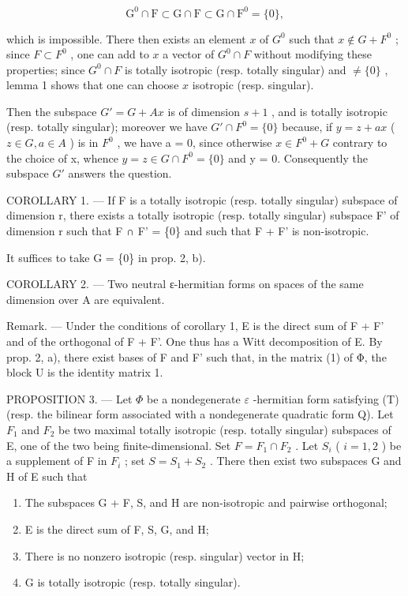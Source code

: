 \[
\mathrm{G} ^ {0} \cap \mathrm{F} \subset \mathrm{G} \cap \mathrm{F} \subset \mathrm{G} \cap \mathrm{F} ^ {0} = \{0 \},
\]

which is impossible. There then exists an element \(x\) of \(G^0\) such that \(x \notin G + F^0\) ; since \(F \subset F^0\) , one can add to \(x\) a vector of \(G^0 \cap F\) without modifying these properties; since \(G^0 \cap F\) is totally isotropic (resp. totally singular) and \(\neq \{0\}\) , lemma 1 shows that one can choose \(x\) isotropic (resp. singular).

Then the subspace \(G' = G + Ax\) is of dimension \(s + 1\) , and is totally isotropic (resp. totally singular); moreover we have \(G' \cap F^{0} = \{0\}\) because, if \(y = z + ax\) ( \(z \in G, a \in A\) ) is in \(F^{0}\) , we have a = 0, since otherwise \(x \in F^{0} + G\) contrary to the choice of x, whence \(y = z \in G \cap F^{0} = \{0\}\) and y = 0. Consequently the subspace \(G'\) answers the question.

COROLLARY 1. --- If F is a totally isotropic (resp. totally singular) subspace of dimension r, there exists a totally isotropic (resp. totally singular) subspace F' of dimension r such that F ∩ F' = \{0\} and such that F + F' is non-isotropic.

It suffices to take G = \{0\} in prop. 2, b).

COROLLARY 2. --- Two neutral ε-hermitian forms on spaces of the same dimension over A are equivalent.

Remark. --- Under the conditions of corollary 1, E is the direct sum of F + F' and of the orthogonal of F + F'. One thus has a Witt decomposition of E. By prop. 2, a), there exist bases of F and F' such that, in the matrix (1) of Φ, the block U is the identity matrix 1.

PROPOSITION 3. --- Let \(\Phi\) be a nondegenerate \(\varepsilon\) -hermitian form satisfying (T) (resp. the bilinear form associated with a nondegenerate quadratic form Q). Let \(F_{1}\) and \(F_{2}\) be two maximal totally isotropic (resp. totally singular) subspaces of E, one of the two being finite-dimensional. Set \(F = F_{1} \cap F_{2}\) . Let \(S_{i}\) ( \(i = 1, 2\) ) be a supplement of F in \(F_{i}\) ; set \(S = S_{1} + S_{2}\) . There then exist two subspaces G and H of E such that

\begin{enumerate}
\def\labelenumi{\alph{enumi})}
\item
  The subspaces G + F, S, and H are non-isotropic and pairwise orthogonal;
\item
  E is the direct sum of F, S, G, and H;
\item
  There is no nonzero isotropic (resp. singular) vector in H;
\item
  G is totally isotropic (resp. totally singular).
\end{enumerate}

